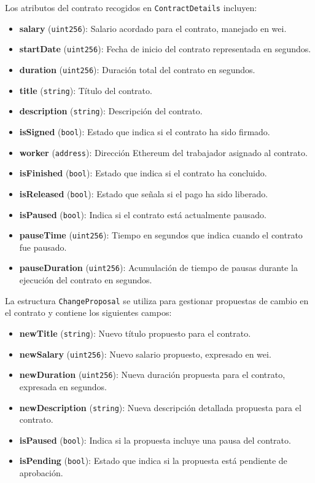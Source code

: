 Los atributos del contrato recogidos en  \texttt{ContractDetails} incluyen:
\begin{itemize}
    \item \textbf{salary} (\texttt{uint256}): Salario acordado para el
 	 contrato, manejado en wei.
    \item \textbf{startDate} (\texttt{uint256}): Fecha de inicio del
     contrato representada en segundos.
    \item \textbf{duration} (\texttt{uint256}): Duración total del contrato
     en segundos.
    \item \textbf{title} (\texttt{string}): Título del contrato.
    \item \textbf{description} (\texttt{string}): Descripción del
     contrato.
    \item \textbf{isSigned} (\texttt{bool}): Estado que indica si el
     contrato ha sido firmado.
    \item \textbf{worker} (\texttt{address}): Dirección Ethereum del
     trabajador asignado al contrato.
    \item \textbf{isFinished} (\texttt{bool}): Estado que indica si el
     contrato ha concluido.
    \item \textbf{isReleased} (\texttt{bool}): Estado que señala si el pago
     ha sido liberado.
    \item \textbf{isPaused} (\texttt{bool}): Indica si el contrato está
     actualmente pausado.
    \item \textbf{pauseTime} (\texttt{uint256}): Tiempo en segundos que
     indica cuando el contrato fue pausado.
    \item \textbf{pauseDuration} (\texttt{uint256}): Acumulación de tiempo
     de pausas durante la ejecución del contrato en segundos.
\end{itemize}

La estructura \texttt{ChangeProposal} se utiliza para gestionar propuestas de cambio en el contrato y contiene los siguientes campos:
\begin{itemize}
    \item \textbf{newTitle} (\texttt{string}): Nuevo título propuesto para
     el contrato.
    \item \textbf{newSalary} (\texttt{uint256}): Nuevo salario propuesto,
     expresado en wei.
    \item \textbf{newDuration} (\texttt{uint256}): Nueva duración propuesta
     para el contrato, expresada en segundos.
    \item \textbf{newDescription} (\texttt{string}): Nueva descripción
     detallada propuesta para el contrato.
    \item \textbf{isPaused} (\texttt{bool}): Indica si la propuesta incluye
     una pausa del contrato.
    \item \textbf{isPending} (\texttt{bool}): Estado que indica si la
     propuesta está pendiente de aprobación.
\end{itemize}

